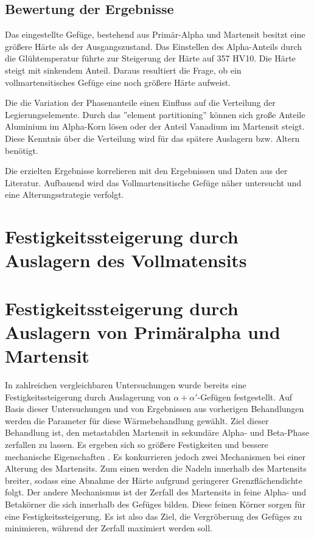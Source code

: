 \documentclass[a4paper, 11pt]{tubsreprt}
\begin{document}
\subsection{Bewertung der Ergebnisse}
Das eingestellte Gefüge, bestehend aus Primär-Alpha und Martensit besitzt eine größere Härte als der Ausgangszustand. Das Einstellen des Alpha-Anteils durch die Glühtemperatur führte zur Steigerung der Härte auf 357 HV10. Die Härte steigt mit sinkendem Anteil. Daraus resultiert die Frage, ob ein vollmartensitisches Gefüge eine noch größere Härte aufweist.

Die die Variation der Phasenanteile einen Einfluss auf die Verteilung der Legierungselemente. Durch das ''element partitioning'' können sich große Anteile Aluminium im Alpha-Korn lösen oder der Anteil Vanadium im Martensit steigt. Diese Kenntnis über die Verteilung wird für das spätere Auslagern bzw. Altern benötigt. 

Die erzielten Ergebnisse korrelieren mit den Ergebnissen und Daten aus der Literatur. Aufbauend wird das Vollmartensitische Gefüge näher untersucht und eine Alterungsstrategie verfolgt.   


\section{Festigkeitssteigerung durch Auslagern des Vollmatensits}
\section{Festigkeitssteigerung durch Auslagern von Primäralpha und Martensit}\label{Primäralpha und martensit}
In zahlreichen vergleichbaren Untersuchungen wurde bereits eine Festigkeitssteigerung durch Auslagerung von $\alpha + \alpha'$-Gefügen festgestellt. Auf Basis dieser Untersuchungen und von Ergebnissen aus vorherigen Behandlungen werden die Parameter für diese Wärmebehandlung gewählt. Ziel dieser Behandlung ist, den metastabilen Martensit in sekundäre Alpha- und Beta-Phase zerfallen zu lassen. Es ergeben sich so größere Festigkeiten und bessere mechanische Eigenschaften \cite{Gilbert2004}. Es konkurrieren jedoch zwei Mechanismen bei einer Alterung des Martensits. Zum einen werden die Nadeln innerhalb des Martensits breiter, sodass eine Abnahme der Härte aufgrund geringerer Grenzflächendichte folgt. Der andere Mechanismus ist der Zerfall des Martensits in feine Alpha- und Betakörner die sich innerhalb des Gefüges bilden. Diese feinen Körner sorgen für eine Festigkeitssteigerung. Es ist also das Ziel, die Vergröberung des Gefüges zu minimieren, während der Zerfall maximiert werden soll. 
\end{document}
